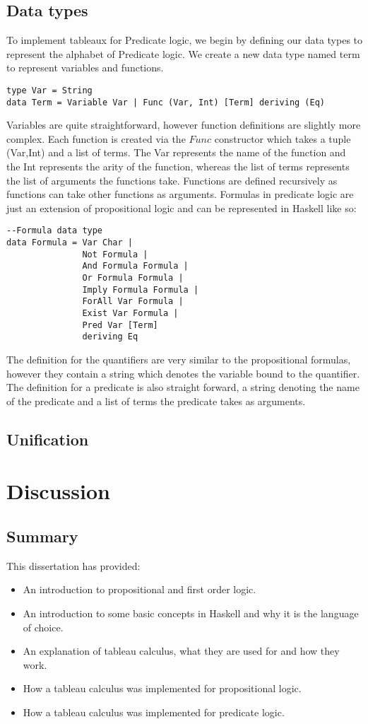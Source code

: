 \documentclass{article}%
\begin{document}
\subsection{Data types} 
To implement tableaux for Predicate logic, we begin by defining our data types to represent the alphabet of Predicate logic. We create a new data type named term to represent variables and functions.
\begin{verbatim}
type Var = String 
data Term = Variable Var | Func (Var, Int) [Term] deriving (Eq)  
\end{verbatim}
Variables are quite straightforward, however function definitions are slightly more complex. Each function is created via the $Func$ constructor which takes a tuple (Var,Int) and a list of terms. The Var represents the name of the function and the Int represents the arity of the function, whereas the list of terms represents the list of arguments the functions take. Functions are defined recursively as functions can take other functions as arguments. 
Formulas in predicate logic are just an extension of propositional logic and can be represented in Haskell like so: 
\begin{verbatim}
--Formula data type
data Formula = Var Char |
               Not Formula | 
               And Formula Formula | 
               Or Formula Formula | 
               Imply Formula Formula | 
               ForAll Var Formula |
               Exist Var Formula |
               Pred Var [Term]
               deriving Eq
\end{verbatim}
The definition for the quantifiers are very similar to the propositional formulas, however they contain a string which denotes the variable bound to the quantifier. The definition for a predicate is also straight forward, a string denoting the name of the predicate and a list of terms the predicate takes as arguments. 
\subsection{Unification}


\section{Discussion}
\subsection{Summary}
This dissertation has provided:
\begin{itemize}
\item An introduction to propositional and first order logic.
\item An introduction to some basic concepts in Haskell and why it is the language of choice. 
\item An explanation of tableau calculus, what they are used for and how they work. 
\item How a tableau calculus was implemented for propositional logic.
\item How a tableau calculus was implemented for predicate logic. 
\end{itemize}
\end{document}
